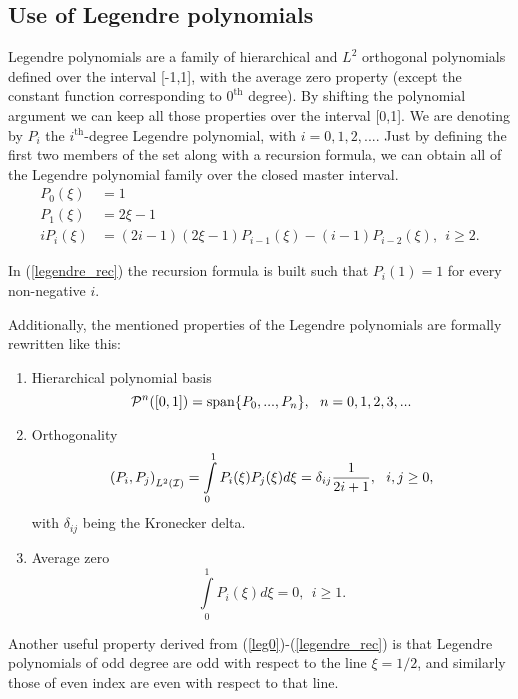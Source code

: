 \subsection{Use of Legendre polynomials}
\label{usinglegendre}
Legendre polynomials are a family of hierarchical and $L^2$ orthogonal polynomials defined over the interval [-1,1], with the average zero property (except the constant function corresponding to $0^\text{th}$ degree). By shifting the polynomial argument we can keep all those properties over the interval [0,1]. We are denoting by $P_i$ the $i^\text{th}$-degree Legendre polynomial, with $i=0,1,2,...$. Just by defining the first two members of the set along with a recursion formula, we can obtain all of the Legendre polynomial family over the closed master interval.
% 
\begin{align}
    P_0(\xi)&=1 \label{leg0} \\
    P_1(\xi)&=2\xi-1 \\
    iP_i(\xi)&=(2i-1)(2\xi-1)P_{i-1}(\xi)-(i-1)P_{i-2}(\xi),\ \ i\geq 2.\label{legendre_rec}
\end{align}

In (\ref{legendre_rec}) the recursion formula is built such that $P_i(1)=1$ for every non-negative $i$.

Additionally, the mentioned properties of the Legendre polynomials are formally rewritten like this:
\begin{enumerate}
    \item Hierarchical polynomial basis
    \begin{equation}
        \mcP^n([0,1])=\spann\{P_0,...,P_n\},\ \ n=0,1,2,3,...\label{hier_leg}
    \end{equation}
    \item Orthogonality
    \begin{equation}
        \left(P_i,P_j\right)_{L^2(\mathcal{I})}=\int\limits_0^1 P_i(\xi)P_j(\xi)d\xi=\delta_{ij}\frac{1}{2i+1},\ \ i,j\geq 0,\label{orth_leg}
    \end{equation}
    with $\delta_{ij}$ being the Kronecker delta.
    \item Average zero
    \begin{equation}
        \int\limits_0^1 P_i(\xi)d\xi=0,\ \ i\geq 1. \label{avgzero}
    \end{equation}    
\end{enumerate}

Another useful property derived from (\ref{leg0})-(\ref{legendre_rec}) is that Legendre polynomials of odd degree are odd with respect to the line $\xi=1/2$, and similarly those of even index are even with respect to that line.

